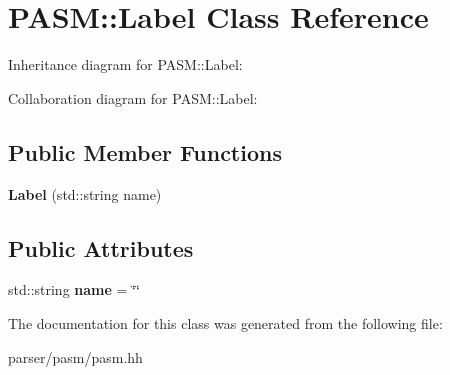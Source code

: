 \hypertarget{classPASM_1_1Label}{}\section{P\+A\+SM\+:\+:Label Class Reference}
\label{classPASM_1_1Label}


Inheritance diagram for P\+A\+SM\+:\+:Label\+:


Collaboration diagram for P\+A\+SM\+:\+:Label\+:
\subsection*{Public Member Functions}
\begin{DoxyCompactItemize}
\item 
\mbox{\label{classPASM_1_1Label_ad943bc8a7b091947909155075f9bdc5a}} 
{\bfseries Label} (std\+::string name)
\end{DoxyCompactItemize}
\subsection*{Public Attributes}
\begin{DoxyCompactItemize}
\item 
\mbox{\label{classPASM_1_1Label_afb9a4bbd9b8ce5a1c9ca94e8c6bc39f8}} 
std\+::string {\bfseries name} = \char`\"{}\char`\"{}
\end{DoxyCompactItemize}


The documentation for this class was generated from the following file\+:\begin{DoxyCompactItemize}
\item 
parser/pasm/pasm.\+hh\end{DoxyCompactItemize}
